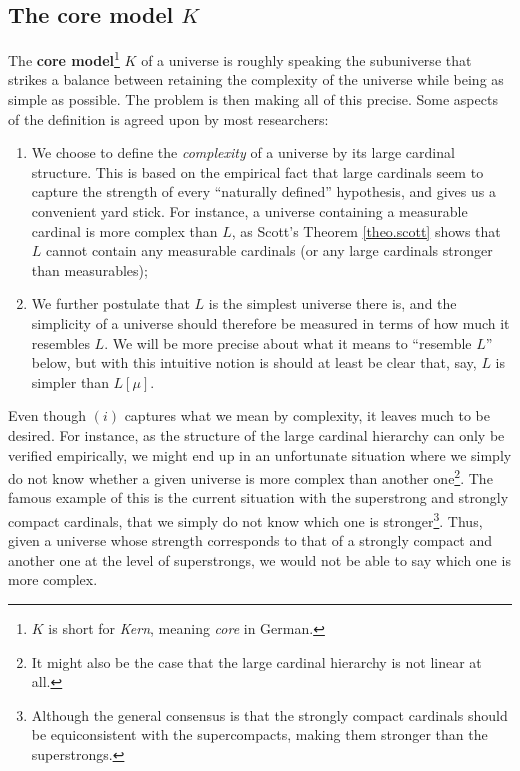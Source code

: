\documentclass[../../main]{subfiles}
\begin{document}
\subsection{The core model $K$}

The \textbf{core model}\footnote{$K$ is short for \textit{Kern}, meaning \textit{core} in German.} $K$ of a universe is roughly speaking the subuniverse that strikes a balance between retaining the complexity of the universe while being as simple as possible. The problem is then making all of this precise. Some aspects of the definition is agreed upon by most researchers:
\begin{enumerate}
  \item We choose to define the \textit{complexity} of a universe by its large cardinal structure. This is based on the empirical fact that large cardinals seem to capture the strength of every ``naturally defined'' hypothesis, and gives us a convenient yard stick. For instance, a universe containing a measurable cardinal is more complex than $L$, as Scott's Theorem \ref{theo.scott} shows that $L$ cannot contain any measurable cardinals (or any large cardinals stronger than measurables);
  \item We further postulate that $L$ is the simplest universe there is, and the simplicity of a universe should therefore be measured in terms of how much it resembles $L$. We will be more precise about what it means to ``resemble $L$'' below, but with this intuitive notion is should at least be clear that, say, $L$ is simpler than $L[\mu]$.\\
\end{enumerate}

Even though $(i)$ captures what we mean by complexity, it leaves much to be desired. For instance, as the structure of the large cardinal hierarchy can only be verified empirically, we might end up in an unfortunate situation where we simply do not know whether a given universe is more complex than another one\footnote{It might also be the case that the large cardinal hierarchy is not linear at all.}. The famous example of this is the current situation with the superstrong and strongly compact cardinals, that we simply do not know which one is stronger\footnote{Although the general consensus is that the strongly compact cardinals should be equiconsistent with the supercompacts, making them stronger than the superstrongs.}. Thus, given a universe whose strength corresponds to that of a strongly compact and another one at the level of superstrongs, we would not be able to say which one is more complex. 
\end{document}
